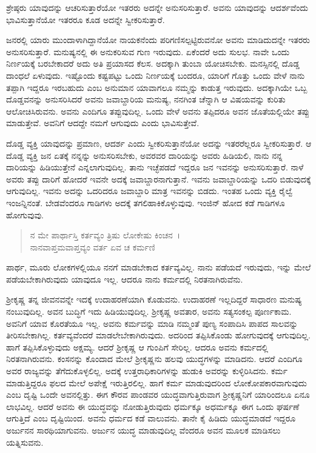 {\small ಶ್ರೇಷ್ಠರು ಯಾವುದನ್ನು ಆಚರಿಸುತ್ತಾರೆಯೋ ಇತರರು ಅದನ್ನೇ ಅನುಸರಿಸುತ್ತಾರೆ. ಅವನು ಯಾವುದನ್ನು ಆದರ್ಶವೆಂದು ಭಾವಿಸುತ್ತಾನೆಯೋ ಇತರರೂ ಕೂಡ ಅದನ್ನೇ ಸ್ವೀಕರಿಸುತ್ತಾರೆ.}

ಜನರಲ್ಲಿ ಯಾರು ಮುಂದಾಳಾಗಿದ್ದಾನೆಯೋ ನಾಯಕನೆಂದು ಪರಿಗಣಿಸಲ್ಪಟ್ಟಿರುವನೋ ಅವನು ಮಾಡಿದುದನ್ನೇ ಇತರರು ಅನುಸರಿಸುತ್ತಾರೆ. ಮನುಷ್ಯನಲ್ಲಿ ಈ ಅನುಕರಿಸುವ ಗುಣ ಇರುವುದು. ಏಕೆಂದರೆ ಅದು ಸುಲಭ. ನಾವೇ ಒಂದು ನಿರ್ಣಯಕ್ಕೆ ಬರಬೇಕಾದರೆ ಅದು ಅತಿ ಪ್ರಯಾಸದ ಕೆಲಸ. ಅದಕ್ಕಾಗಿ ತುಂಬಾ ಯೋಚಿಸಬೇಕು. ಮನಸ್ಸಿನಲ್ಲಿ ದೊಡ್ಡ ದಾಂಧಲೆ ಏಳುವುದು. ಇಷ್ಟೊಂದು ಕಷ್ಟಪಟ್ಟು ಒಂದು ನಿರ್ಣಯಕ್ಕೆ ಬಂದರೂ, ಯಾರಿಗೆ ಗೊತ್ತು ಒಂದು ವೇಳೆ ನಾನು ತಪ್ಪಾಗಿ ಇದ್ದರೂ ಇರಬಹುದು ಎಂಬ ಅನುಮಾನ ಯಾವಾಗಲೂ ನಮ್ಮನ್ನು ಕಾಡುತ್ತ ಇರುವುದು. ಅದಕ್ಕಾಗಿಯೇ ಒಬ್ಬ ದೊಡ್ಡವನನ್ನು ಅನುಸರಿಸಿದರೆ ಅವನು ಜವಾಬ್ದಾರಿಯ ಮನುಷ್ಯ, ನನಗಿಂತ ಚೆನ್ನಾಗಿ ಆ ವಿಷಯವನ್ನು ಕುರಿತು ಆಲೋಚಿಸಿರುವನು. ಅವನು ಎಂದಿಗೂ ತಪ್ಪುವುದಿಲ್ಲ. ಒಂದು ವೇಳೆ ಅವನು ತಪ್ಪಿದರೂ ಅವನ ಜೊತೆಯಲ್ಲಿಯೇ ತಪ್ಪು ಮಾಡುತ್ತೇವೆ. ಅವನಿಗೆ ಆದದ್ದೇ ನಮಗೆ ಆಗುವುದು ಎಂದು ಭಾವಿಸುತ್ತೇವೆ.

ದೊಡ್ಡ ವ್ಯಕ್ತಿ ಯಾವುದನ್ನು ಪ್ರಮಾಣ, ಆದರ್ಶ ಎಂದು ಸ್ವೀಕರಿಸುತ್ತಾನೆಯೋ ಅದನ್ನು ಇತರರೆಲ್ಲರೂ ಸ್ವೀಕರಿಸುತ್ತಾರೆ. ಆ ದೊಡ್ಡ ವ್ಯಕ್ತಿ ಜನ ಏತಕ್ಕೆ ನನ್ನನ್ನು ಅನುಸರಿಸಬೇಕು, ಅವರವರ ದಾರಿಯನ್ನು ಅವರು ಹಿಡಿಯಲಿ, ನಾನು ನನ್ನ ದಾರಿಯನ್ನು ಹಿಡಿಯುತ್ತೇನೆ ಎನ್ನಲಾಗುವುದಿಲ್ಲ. ತಾನು ಇಚ್ಛೆಪಡದೆ ಇದ್ದರೂ ಜನ ಇವನನ್ನು ಅನುಸರಿಸುತ್ತಾರೆ. ನಾಳೆ ಅವರು ತಪ್ಪು ದಾರಿಗೆ ಹೋದರೆ ಇವನೇ ಅದಕ್ಕೆ ಜವಾಬ್ದಾರನಾಗುತ್ತಾನೆ. ಇವನು ಜವಾಬ್ದಾರಿಯನ್ನು ಒದರಿ ಬಿಡುವುದಕ್ಕೆ ಆಗುವುದಿಲ್ಲ. ಇವನು ಅದನ್ನು ಒದರಿದರೂ ಜವಾಬ್ದಾರಿ ಮಾತ್ರ ಇವನನ್ನು ಬಿಡದು. ಇಂತಹ ಒಂದು ವ್ಯಕ್ತಿ ರೈಲ್ವೆ ಇಂಜನ್ನಿನಂತೆ. ಬೇಡವೆಂದರೂ ಗಾಡಿಗಳು ಅದಕ್ಕೆ ತಗಲಿಹಾಕಿಕೊಳ್ಳುವುವು. ಇಂಜಿನ್ ಹೋದ ಕಡೆ ಗಾಡಿಗಳೂ ಹೋಗುವುವು.

\begin{verse}
ನ ಮೇ ಪಾರ್ಥಾಸ್ತಿ ಕರ್ತವ್ಯಂ ತ್ರಿಷು ಲೋಕೇಷು ಕಿಂಚನ~।\\ನಾನವಾಪ್ತಮವಾಪ್ತವ್ಯಂ ವರ್ತ ಏವ ಚ ಕರ್ಮಣಿ 
\end{verse}

{\small ಪಾರ್ಥ, ಮೂರು ಲೋಕಗಳಲ್ಲಿಯೂ ನನಗೆ ಮಾಡಬೇಕಾದ ಕರ್ತವ್ಯವಿಲ್ಲ. ನಾನು ಪಡೆಯದೆ ಇರುವುದು, ಇನ್ನು ಮೇಲೆ ಪಡೆಯಬೇಕಾಗಿರುವುದು ಯಾವುದೂ ಇಲ್ಲ. ಆದರೂ ನಾನು ಕರ್ಮದಲ್ಲಿ ನಿರತನಾಗಿರುವೆನು.}

ಶ‍್ರೀಕೃಷ್ಣ ತನ್ನ ಜೀವನವನ್ನೇ ಇದಕ್ಕೆ ಉದಾಹರಣೆಯಾಗಿ ಕೊಡುವನು. ಉದಾಹರಣೆ ಇಲ್ಲದಿದ್ದರೆ ಸಾಧಾರಣ ಮನುಷ್ಯ ನಂಬುವುದಿಲ್ಲ. ಅವನ ಬುದ್ಧಿಗೆ ಇದು ಹಿಡಿಯುವುದಿಲ್ಲ. ಶ‍್ರೀಕೃಷ್ಣ ಅವತಾರ, ಅವನು ಸತ್ಯಸಂಕಲ್ಪ ಪೂರ್ಣಕಾಮ. ಅವನಿಗೆ ಯಾವ ಕೊರತೆಯೂ ಇಲ್ಲ. ಅವನು ಕರ್ಮವನ್ನು ಮಾಡಿ ನಮ್ಮಂತೆ ಪುಣ್ಯ ಸಂಪಾದಿಸಿ ಪಾಪದ ಸಾಲವನ್ನು ತೀರಿಸಬೇಕಾಗಿಲ್ಲ. ಕರ್ತವ್ಯವೆಂದರೆ ಮಾಡಲೇಬೇಕಾಗಿರುವುದು. ಅದರಿಂದ ತಪ್ಪಿಸಿಕೊಂಡು ಹೋಗುವುದಕ್ಕೆ ಆಗುವುದಿಲ್ಲ. ಹಾಗೆ ತಪ್ಪಿಸಿಕೊಳ್ಳುವುದು ಅಕ್ಷಮ್ಯ. ಆದರೆ ಶ‍್ರೀಕೃಷ್ಣ ಆ ಗುಂಪಿಗೆ ಸೇರಿಲ್ಲ. ಆದರೂ ಅವನು ಕರ್ಮದಲ್ಲಿ ನಿರತನಾಗಿರುವನು. ಕಂಸನನ್ನು ಕೊಂದಾದ ಮೇಲೆ ಶ‍್ರೀಕೃಷ್ಣನು ಹಲವು ಯುದ್ಧಗಳನ್ನು ಮಾಡಿದನು. ಆದರೆ ಎಂದಿಗೂ ಅವರ ರಾಜ್ಯವನ್ನು ತೆಗೆದುಕೊಳ್ಳಲಿಲ್ಲ. ಅದಕ್ಕೆ ಉತ್ತರಾಧಿಕಾರಿಗಳನ್ನು ಹುಡುಕಿ ಅವರನ್ನು ಕುಳ್ಳಿರಿಸಿದನು. ಕರ್ಮ ಮಾಡುತ್ತಿದ್ದರೂ ಫಲದ ಮೇಲೆ ಅಪೇಕ್ಷೆ ಇರುತ್ತಿರಲಿಲ್ಲ. ಹಾಗೆ ಕರ್ಮ ಮಾಡುವುದರಿಂದ ಲೋಕೋಪಕಾರವಾಗುವುದು ಎಂಬ ದೃಷ್ಟಿ ಒಂದೇ ಅವನಲ್ಲಿತ್ತು. ಈಗ ಕೌರವ ಪಾಂಡವರ ಯುದ್ಧವಾಗುತ್ತಿರುವಾಗ ಶ‍್ರೀಕೃಷ್ಣನಿಗೆ ಯಾರಿಂದಲೂ ಏನೂ ಲಾಭವಿಲ್ಲ. ಆದರೆ ಅವನು ಈ ಯುದ್ಧವನ್ನು ನೋಡುತ್ತಿರುವುದು ಧರ್ಮಕ್ಕೂ ಅಧರ್ಮಕ್ಕೂ ಈಗ ಒಂದು ಘರ್ಷಣೆ ಆಗುತ್ತಿದೆ ಎಂಬ ದೃಷ್ಟಿಯಿಂದ. ಅವನು ಧರ್ಮದ ಕಡೆ ವಾಲುವನು. ತಾನೇ ಕೈ ಹಿಡಿದು ಯುದ್ಧಮಾಡದೆ ಇದ್ದರೂ ಅರ್ಜುನನ ಸಾರಥಿಯಾಗುವನು. ಅರ್ಜುನ ಯುದ್ಧ ಮಾಡುವುದಿಲ್ಲ ವೆಂದರೂ ಅವನ ಮೂಲಕ ಮಾಡಿಸಲು ಯತ್ನಿಸುವನು.

